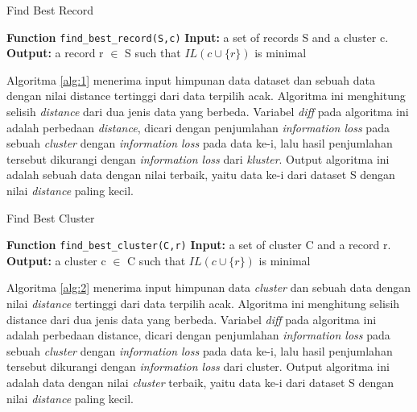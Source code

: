 \begin{algorithm}[H]
  \caption{Find Best Record}\label{alg:1}
  \begin{algorithmic}[1]
  \State \textbf{Function} \texttt{find\_best\_record(S,c)}
  \State \textbf{Input:} a set of records S and a cluster c.
  \State \textbf{Output:} a record r $\in$ S such that $IL(c \cup \{r\})$ is minimal
  \\
  \EndIf
  \EndFor
  \end{algorithmic}
\end{algorithm}
Algoritma \ref{alg:1} menerima input himpunan data dataset dan sebuah data dengan nilai distance tertinggi dari data terpilih acak. Algoritma ini menghitung selisih \textit{distance} dari dua jenis data yang berbeda. Variabel \textit{diff} pada algoritma ini adalah perbedaan \textit{distance}, dicari dengan penjumlahan \textit{information loss} pada sebuah \textit{cluster} dengan \textit{information loss} pada data ke-i, lalu hasil penjumlahan tersebut dikurangi dengan \textit{information loss} dari \textit{kluster}. Output algoritma ini adalah sebuah data dengan nilai terbaik, yaitu data ke-i dari dataset S dengan nilai \textit{distance} paling kecil.
\begin{algorithm}[H]
  \caption{Find Best Cluster}\label{alg:2}
  \begin{algorithmic}[1]
  \State \textbf{Function} \texttt{find\_best\_cluster(C,r)}
  \State \textbf{Input:} a set of cluster C and a record r.
  \State \textbf{Output:} a cluster c $\in$ C such that $IL(c \cup \{r\})$ is minimal
  \\
  \EndIf
  \EndFor
  \end{algorithmic}
\end{algorithm}

Algoritma \ref{alg:2} menerima input himpunan data \textit{cluster} dan sebuah data dengan nilai \textit{distance} tertinggi dari data terpilih acak. Algoritma ini menghitung selisih distance dari dua jenis data yang berbeda. Variabel \textit{diff} pada algoritma ini adalah perbedaan distance, dicari dengan penjumlahan \textit{information loss} pada sebuah \textit{cluster} dengan \textit{information loss} pada data ke-i, lalu hasil penjumlahan tersebut dikurangi dengan \textit{information loss} dari {cluster}. Output algoritma ini adalah data dengan nilai \textit{cluster} terbaik, yaitu data ke-i dari dataset S dengan nilai \textit{distance} paling kecil.

